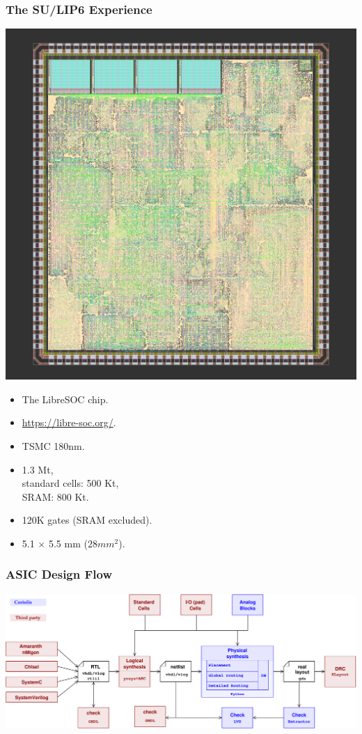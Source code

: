\documentclass[10pt,aspectratio=169,presentation]{beamer}
\begin{document}
  \begin{frame}
    \frametitle{The SU/LIP6 Experience}
     \begin{minipage}[c]{.48\textwidth}
       \includegraphics[height=.80\textheight]{images/ls180_RC1_20210613.png}
     \end{minipage}
     \begin{minipage}[c]{.5\textwidth}
       \begin{itemize}
         \item The LibreSOC chip.
         \item \url{https://libre-soc.org/}.
         \item TSMC 180nm.
         \item 1.3 Mt, \\ standard cells: 500 Kt, \\ SRAM: 800 Kt.
         \item 120K gates (\uppercase{SRAM} excluded).
         \item 5.1 $\times$ 5.5 mm ($28mm^2$).
       \end{itemize}
     \end{minipage}
  \end{frame}


   \begin{frame}
     \frametitle{ASIC Design Flow}
     \begin{center}
       \includegraphics[width=.95\textwidth]{images/design-flow-6} \\
     \end{center}
   \end{frame}
\end{document}
